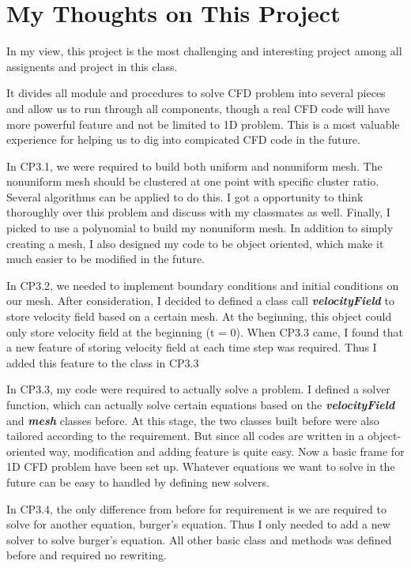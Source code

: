 \documentclass[11pt]{article}
\begin{document}
\section{My Thoughts on This Project}
In my view, this project is the most challenging and interesting project among all assignents and project in this class. 
\par
It divides all module and procedures to solve CFD problem into several pieces and allow us to run through all components, though a real CFD code will have more powerful feature and not be limited to 1D problem. This is a most valuable experience for helping us to dig into compicated CFD code in the future.
\par
In CP3.1, we were required to build both uniform and nonuniform mesh. 
The nonuniform mesh should be clustered at one point with specific cluster ratio. 
Several algorithms can be applied to do this. 
I got a opportunity to think thoroughly over this problem and discuss with my classmates as well. 
Finally, I picked to use a polynomial to build my nonuniform mesh.
In addition to simply creating a mesh, I also designed my code to be object oriented, which make it much easier to be modified in the future.
\par
In CP3.2, we needed to implement boundary conditions and initial conditions on our mesh.
After consideration, I decided to defined a class call \textbf{\textit{velocityField}} to store velocity field based on a certain mesh.
At the beginning, this object could only store velocity field at the beginning (t = 0). 
When CP3.3 came, I found that a new feature of storing velocity field at each time step was required.
Thus I added this feature to the class in CP3.3 
\par
In CP3.3, my code were required to actually solve a problem. 
I defined a solver function, which can actually solve certain equations based on the \textbf{\textit{velocityField}} and \textbf{\textit{mesh}} classes before.
At this stage, the two classes built before were also tailored according to the requirement.
But since all codes are written in a object-oriented way, modification and adding feature is quite easy.
Now a basic frame for 1D CFD problem have been set up. 
Whatever equations we want to solve in the future can be easy to handled by defining new solvers.
\par
In CP3.4, the only difference from before for requirement is we are required to solve for another equation, burger's equation. 
Thus I only needed to add a new solver to solve burger's equation. 
All other basic class and methods was defined before and required no rewriting. 
\par
\end{document}

